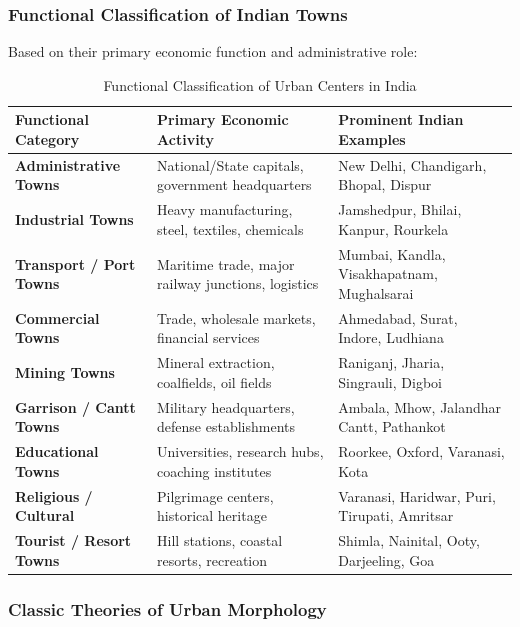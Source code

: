\documentclass[11pt,a4paper]{article}
\begin{document}
\subsubsection{Functional Classification of Indian Towns}
Based on their primary economic function and administrative role:
\begin{table}[h!]
\centering
\small
\begin{tabularx}{\textwidth}{l X X}
\toprule
\textbf{Functional Category} & \textbf{Primary Economic Activity} & \textbf{Prominent Indian Examples} \\
\midrule
\textbf{Administrative Towns} & National/State capitals, government headquarters & New Delhi, Chandigarh, Bhopal, Dispur \\
\textbf{Industrial Towns} & Heavy manufacturing, steel, textiles, chemicals & Jamshedpur, Bhilai, Kanpur, Rourkela \\
\textbf{Transport / Port Towns} & Maritime trade, major railway junctions, logistics & Mumbai, Kandla, Visakhapatnam, Mughalsarai \\
\textbf{Commercial Towns} & Trade, wholesale markets, financial services & Ahmedabad, Surat, Indore, Ludhiana \\
\textbf{Mining Towns} & Mineral extraction, coalfields, oil fields & Raniganj, Jharia, Singrauli, Digboi \\
\textbf{Garrison / Cantt Towns} & Military headquarters, defense establishments & Ambala, Mhow, Jalandhar Cantt, Pathankot \\
\textbf{Educational Towns} & Universities, research hubs, coaching institutes & Roorkee, Oxford, Varanasi, Kota \\
\textbf{Religious / Cultural} & Pilgrimage centers, historical heritage & Varanasi, Haridwar, Puri, Tirupati, Amritsar \\
\textbf{Tourist / Resort Towns} & Hill stations, coastal resorts, recreation & Shimla, Nainital, Ooty, Darjeeling, Goa \\
\bottomrule
\end{tabularx}
\caption{Functional Classification of Urban Centers in India}
\end{table}

\subsubsection{Classic Theories of Urban Morphology}
\end{document}
